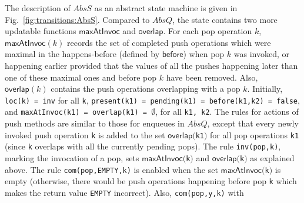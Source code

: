 The description of $AbsS$ as an abstract state machine is given in Fig.~\ref{fig:transitions:AbsS}. Compared to $AbsQ$, the state contains two more updatable functions $\mathsf{maxAtInvoc}$ and $\mathsf{overlap}$. For each pop operation $k$, $\mathsf{maxAtInvoc}(k)$ records the set of completed push operations which were maximal in the happens-before (defined by $\mathsf{before}$) when pop $k$ was invoked, or happening earlier provided that the values of all the pushes happening later than one of these maximal ones and before pop $k$ have been removed. Also, $\mathsf{overlap}(k)$ contains the push operations overlapping with a pop $k$.
Initially, {\tt loc(k) = inv} for all {\tt k}, {\tt present(k1) = pending(k1) = before(k1,k2) = false}, and {\tt maxAtInvoc(k1) = overlap(k1) = }$\emptyset$, for all {\tt k1, k2}.
The rules for actions of push methods are similar to those for enqueues in $AbsQ$, except that every newly invoked push operation {\tt k} is added to the set $\mathsf{overlap}(${\tt k1}$)$ for all pop operations {\tt k1} (since {\tt k} overlaps with all the currently pending pops). 
The rule {\tt inv(pop,k)}, marking the invocation of a pop, sets $\mathsf{maxAtInvoc}(${\tt k}$)$ and $\mathsf{overlap}(${\tt k}$)$ as explained above. The rule {\tt com(pop,EMPTY,k)} is enabled when 
the set $\mathsf{maxAtInvoc}(${\tt k}$)$ is empty (otherwise, there would be push operations happening before pop {\tt k} which makes the return value {\tt EMPTY} incorrect). Also, {\tt com(pop,y,k)} with 
